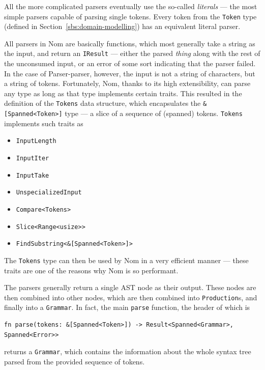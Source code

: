 \documentclass[english,bachelors,forcepolishlogotype]{wizthesis}
\newcommand{\thisproject}{Parser-parser}
\begin{document}
All the more complicated parsers eventually use the so-called \emph{literals}
--- the most simple parsers capable of parsing single tokens. Every token from
the \texttt{Token} type (defined in Section~\ref{sbs:domain-modelling}) has an
equivalent literal parser.

All parsers in Nom are basically functions, which most generally take a string
as the input, and return an \texttt{IResult} --- either the parsed \emph{thing}
along with the rest of the unconsumed input, or an error of some sort indicating
that the parser failed. In the case of \thisproject{}, however, the input is not
a string of characters, but a string of tokens. Fortunately, Nom, thanks to its
high extensibility, can parse any type as long as that type implements certain
traits. This resulted in the definition of the \texttt{Tokens} data structure,
which encapsulates the \texttt{\&[Spanned<Token>]} type --- a slice of a sequence
of (spanned) tokens. \texttt{Tokens} implements such traits as
\begin{itemize}[noitemsep]
  \item \verb|InputLength|
  \item \verb|InputIter|
  \item \verb|InputTake|
  \item \verb|UnspecializedInput|
  \item \verb|Compare<Tokens>|
  \item \verb|Slice<Range<usize>>|
  \item \verb|FindSubstring<&[Spanned<Token>]>|
\end{itemize}
The \texttt{Tokens} type can then be used by Nom in a very efficient manner ---
these traits are one of the reasons why Nom is so performant.

The parsers generally return a single AST node as their output. These nodes are
then combined into other nodes, which are then combined into
\texttt{Production}s, and finally into a \texttt{Grammar}. In fact, the main
\texttt{parse} function, the header of which is
\begin{verbatim}
fn parse(tokens: &[Spanned<Token>]) -> Result<Spanned<Grammar>, Spanned<Error>>
\end{verbatim}
returns a \texttt{Grammar}, which contains the information about the whole
syntax tree parsed from the provided sequence of tokens.
\end{document}
